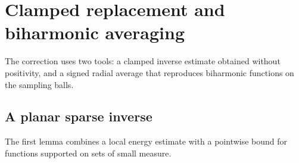 \documentclass[11pt,twoside,leqno]{article}
\numberwithin{equation}{section}
\theoremstyle{definition}
\theoremstyle{remark}
\begin{document}
\section{Clamped replacement and biharmonic averaging}\label{sec:tools}

The correction uses two tools: a clamped inverse estimate obtained
without positivity, and a signed radial average that reproduces
biharmonic functions on the sampling balls.

\subsection{A planar sparse inverse}

The first lemma combines a local energy estimate with a pointwise
bound for functions supported on sets of small measure.
\end{document}
